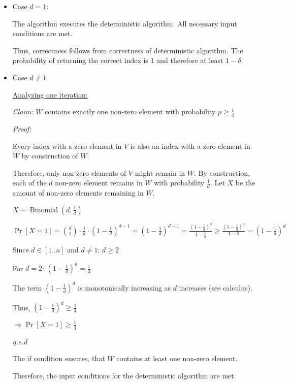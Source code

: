 \begin{itemize}
    \item Case $d = 1$:
    
    The algorithm executes the deterministic algorithm. All necessary input conditions are met.

    Thus, correctness follows from correctness of deterministic algorithm. The probability of returning the correct index is $1$ and therefore at least $1 - \delta$.
    
    
    \item Case $d \neq 1$
    
    \underline{Analyzing one iteration:}
    
    \textit{Claim:} $W$ contains exactly one non-zero element with probability $p \geq \frac{1}{4}$
    
    \textit{Proof:} 
    
    Every index with a zero element in $V$ is also an index with a zero element in $W$ by construction of $W$.
    
    Therefore, only non-zero elements of $V$ might remain in $W$. By construction, each of the $d$ non-zero element remains in $W$ with probability $\frac{1}{d}$. Let $X$ be the amount of non-zero elements remaining in $W$.
    
    $X \sim \operatorname{Binomial}\left(d, \frac{1}{d}\right)$
    
    $\Pr[X = 1] = 
    {d \choose 1} \cdot \frac{1}{d} \cdot \left(1 - \frac{1}{d}\right)^{d-1} = 
    \left(1 - \frac{1}{d}\right)^{d-1} =
    \frac{\left(1 - \frac{1}{d}\right)^{d} }{1 - \frac{1}{d}} \geq
    \frac{\left(1 - \frac{1}{d}\right)^{d} }{1 - 0} = 
    \left(1 - \frac{1}{d}\right)^{d} 
    $ 
    
    Since $d \in [1..n]$ and $d \neq 1$: $d \geq 2$ 

    For $d = 2$: $\left(1 - \frac{1}{d}\right)^{d} = \frac{1}{4}$
        
    The term $\left(1 - \frac{1}{d}\right)^{d}$ is monotonically increasing as $d$ increases (see calculus).  
    
    Thus, $\left(1 - \frac{1}{d}\right)^{d} \geq \frac{1}{4}$
    
    $\Rightarrow \Pr[X = 1] \geq \frac{1}{4}$
    
    \textit{q.e.d}
    
    The if condition ensures, that $W$ contains at least one non-zero element.
    
    Therefore, the input conditions for the deterministic algorithm are met. 
    

\end{itemize}
